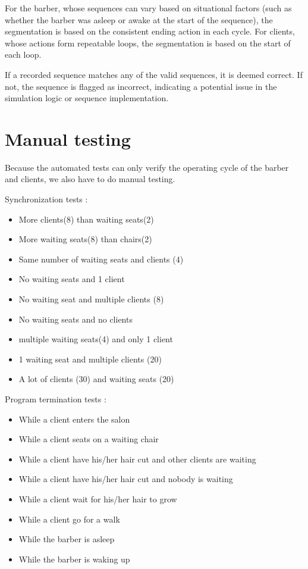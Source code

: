 \documentclass{article}
\begin{document}
    For the barber, whose sequences can vary based on situational factors (such as whether the barber was asleep or awake at the start of the sequence), the segmentation is based on the consistent ending action in each cycle. For clients, whose actions form repeatable loops, the segmentation is based on the start of each loop.

    If a recorded sequence matches any of the valid sequences, it is deemed correct. If not, the sequence is flagged as incorrect, indicating a potential issue in the simulation logic or sequence implementation.

    \pagebreak

    \section{Manual testing}

    Because the automated tests can only verify the operating cycle of the barber and clients, we also have to do manual testing.

    Synchronization tests :
    \begin{itemize}
        \item More clients(8) than waiting seats(2)
        \item More waiting seats(8) than chairs(2)
        \item Same number of waiting seats and clients (4)
        \item No waiting seats and 1 client
        \item No waiting seat and multiple clients (8)
        \item No waiting seats and no clients
        \item multiple waiting seats(4) and only 1 client
        \item 1 waiting seat and multiple clients (20)
        \item A lot of clients (30) and waiting seats (20)
    \end{itemize}

    Program termination tests :
    \begin{itemize}
        \item While a client enters the salon
        \item While a client seats on a waiting chair
        \item While a client have his/her hair cut and other clients are waiting
        \item While a client have his/her hair cut and nobody is waiting
        \item While a client wait for his/her hair to grow
        \item While a client go for a walk
        \item While the barber is asleep
        \item While the barber is waking up
    \end{itemize}
\end{document}

